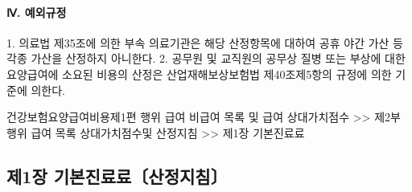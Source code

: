 \paragraph{Ⅳ. 예외규정}
1. 의료법 제35조에 의한 부속 의료기관은 해당 산정항목에 대하여 공휴\cntrdot{} 야간 가산 등 각종 가산을 산정하지 아니한다.
2. 공무원 및 교직원의 공무상 질병 또는 부상에 대한 요양급여에 소요된 비용의 산정은 산업재해보상보험법 제40조제5항의 규정에 의한 기준에 의한다.
  
\begin{mdframed}[linecolor=blue,middlelinewidth=2]
건강보험요양급여비용제1편 행위 급여 \cntrdot{}  비급여 목록 및 급여 상대가치점수 >> 제2부 행위 급여 목록 상대가치점수및  산정지침 >>  제1장 기본진료료
\end{mdframed}  
  
\subsection{제1장 기본진료료〔산정지침〕}
